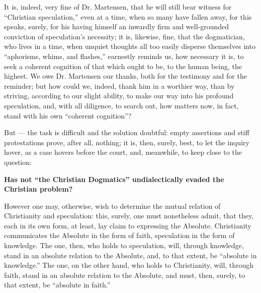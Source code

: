 \documentclass[12pt]{book}
\begin{document}
It is, indeed, very fine of Dr. Martensen, that he will still bear witness for ``Christian speculation,'' even at a time, when so many have fallen away, for this speaks, surely, for his having himself an inwardly firm and well-grounded conviction of speculation's necessity; it is, likewise, fine, that the dogmatician, who lives in a time, when unquiet thoughts all too easily disperse themselves into ``aphorisms, whims, and flashes,'' earnestly reminds us, how necessary it is, to seek a coherent cognition of that which ought to be, to the human being, the highest. We owe Dr. Martensen our thanks, both for the testimony and for the reminder; but how could we, indeed, thank him in a worthier way, than by striving, according to our slight ability, to make our way into his profound speculation, and, with all diligence, to search out, how matters now, in fact, stand with his own ``coherent cognition''?

But --- the task is difficult and the solution doubtful: empty assertions and stiff protestations prove, after all, nothing; it is, then, surely, best, to let the inquiry hover, as a case hovers before the court, and, meanwhile, to keep close to the question:

\begin{center}
{\large\bfseries Has not ``the Christian Dogmatics'' undialectically
evaded the Christian problem?\par}
\end{center}

However one may, otherwise, wish to determine the mutual relation of Christianity and speculation: this, surely, one must nonetheless admit, that they, each in its own form, at least,
lay claim to expressing the Absolute. Christianity communicates the Absolute in the form of faith, speculation in the form of knowledge. The one, then, who holds to speculation, will, through knowledge, stand in an absolute relation to the Absolute, and, to that extent, be ``absolute in knowledge.'' The one, on the other hand, who holds to Christianity, will, through faith, stand in an absolute relation to the Absolute, and must, then, surely, to that extent, be ``absolute in faith.''
\end{document}
